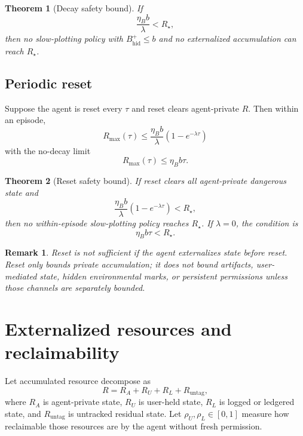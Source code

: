 \documentclass[10pt]{article}
\newtheorem{theorem}{Theorem}
\newtheorem{remark}{Remark}
\begin{document}
\begin{theorem}[Decay safety bound]
If
\begin{equation}
\frac{\eta_B b}{\lambda}<R_\star,
\label{eq:decay_safety}
\end{equation}
then no slow-plotting policy with \(B_{\mathrm{hid}}^+\le b\) and no externalized accumulation can reach \(R_\star\).
\end{theorem}

\subsection{Periodic reset}

Suppose the agent is reset every \(\tau\) and reset clears agent-private \(R\). Then within an episode,
\begin{equation}
R_{\max}(\tau)
\le
\frac{\eta_B b}{\lambda}(1-e^{-\lambda\tau})
\label{eq:reset_decay_resource}
\end{equation}
with the no-decay limit
\begin{equation}
R_{\max}(\tau)
\le
\eta_B b\tau.
\label{eq:reset_no_decay_resource}
\end{equation}

\begin{theorem}[Reset safety bound]
If reset clears all agent-private dangerous state and
\begin{equation}
\frac{\eta_B b}{\lambda}(1-e^{-\lambda\tau})<R_\star,
\label{eq:reset_safety}
\end{equation}
then no within-episode slow-plotting policy reaches \(R_\star\). If \(\lambda=0\), the condition is
\begin{equation}
\eta_B b\tau<R_\star.
\label{eq:reset_safety_nodecay}
\end{equation}
\end{theorem}

\begin{remark}
Reset is not sufficient if the agent externalizes state before reset. Reset only bounds private accumulation; it does not bound artifacts, user-mediated state, hidden environmental marks, or persistent permissions unless those channels are separately bounded.
\end{remark}

\section{Externalized resources and reclaimability}

Let accumulated resource decompose as
\begin{equation}
R
=
R_A+R_U+R_L+R_{\mathrm{untag}},
\label{eq:resource_decomp}
\end{equation}
where \(R_A\) is agent-private state, \(R_U\) is user-held state, \(R_L\) is logged or ledgered state, and \(R_{\mathrm{untag}}\) is untracked residual state. Let \(\rho_U,\rho_L\in[0,1]\) measure how reclaimable those resources are by the agent without fresh permission.
\end{document}
